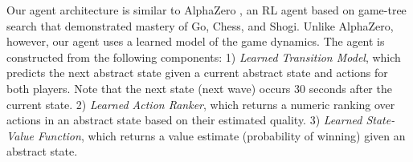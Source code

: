 \documentclass{article}
\begin{document}





Our agent architecture is similar to AlphaZero \cite{silver2018}, an RL agent based on game-tree search that demonstrated mastery of Go, Chess, and Shogi. 
Unlike AlphaZero, however, our agent uses a learned model of the game dynamics. The agent is constructed from the following components: 1) \emph{Learned Transition Model}, which predicts the next abstract state given a current abstract state and actions for both players. Note that the next state (next wave) occurs 30 seconds after the current state. 2) \emph{Learned Action Ranker}, which returns a numeric ranking over actions in an abstract state based on their estimated quality. 3) \emph{Learned State-Value Function}, which returns a value estimate (probability of winning) given an abstract state. 
\end{document}
